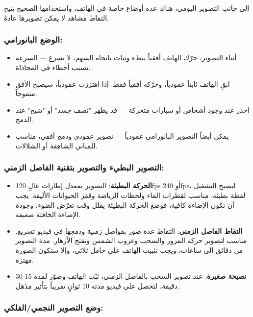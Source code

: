 إلى جانب التصوير اليومي، هناك عدة أوضاع خاصة في الهاتف، واستخدامها الصحيح يتيح التقاط مشاهد لا يمكن تصويرها عادةً.

\subsubsection*{الوضع البانورامي:}

\begin{itemize}
  \item أثناء التصوير، حرّك الهاتف أفقياً ببطء وثبات باتجاه السهم، لا تسرع — السرعة تسبب أخطاء في المحاذاة.
  \item ابقِ الهاتف ثابتاً عمودياً، وحرّكه أفقياً فقط. إذا اهتززت عمودياً، سيصبح الأفق متموجاً.
  \item احذر عند وجود أشخاص أو سيارات متحركة — قد يظهر "نصف جسد" أو "شبح" عند الدمج.
  \item يمكن أيضاً التصوير البانورامي عمودياً — تصوير عمودي ودمج أفقي، مناسب للمباني الشاهقة أو الشلالات.
\end{itemize}

\subsubsection*{التصوير البطيء والتصوير بتقنية الفاصل الزمني:}

\begin{itemize}
  \item \textbf{الحركة البطيئة}: التصوير بمعدل إطارات عالٍ 120fps أو 240fps، ليصبح التشغيل لقطة بطيئة. مناسب لقطرات الماء ولحظات الرياضة وقفز الحيوانات الأليفة. يجب أن تكون الإضاءة كافية، فوضع الحركة البطيئة يقلل وقت تعرّض الضوء، وجودة الإضاءة الخافتة ضعيفة.
  \item \textbf{التقاط الفاصل الزمني}: التقاط عدة صور بفواصل زمنية ودمجها في فيديو تسريع. مناسب لتصوير حركة المرور والسحب وغروب الشمس وتفتح الأزهار. مدة التصوير من دقائق إلى ساعات، ويجب تثبيت الهاتف على حامل ثلاثي، وإلا ستكون الصورة مهتزة.
  \item \textbf{نصيحة صغيرة}: عند تصوير السحب بالفاصل الزمني، ثبّت الهاتف وصوّر لمدة 15-30 دقيقة، لتحصل على فيديو مدته 10 ثوانٍ تقريباً بتأثير مذهل.
\end{itemize}

\subsubsection*{وضع التصوير النجمي/الفلكي:}

